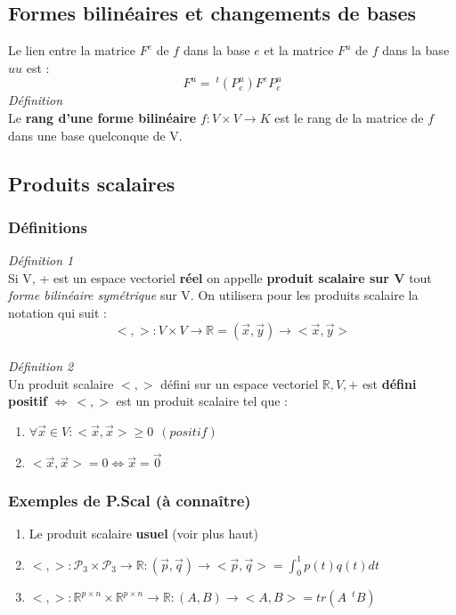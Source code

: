 \documentclass[12pt, a4paper, openany]{article}
\begin{document}
\subsection{Formes bilinéaires et changements de bases}
Le lien entre la matrice $F^e$ de $f$ dans la base $e$ et la matrice $F^u$ de $f$ dans la base $uu$ est :
$$F^u =\ ^t(P_e^u)F^eP^u_e$$
\emph{Définition}\\
Le \textbf{rang d'une forme bilinéaire} $f : V \times V \rightarrow K$ est le rang de la matrice de $f$ dans une base quelconque de V.

\subsection{Produits scalaires}
\subsubsection{Définitions}
\emph{Définition 1}\\
Si V, + est un espace vectoriel \textbf{réel} on appelle \textbf{produit scalaire sur V} tout \textit{forme bilinéaire symétrique} sur V. On utilisera pour les produits scalaire la notation qui suit :
$$< , > : V \times V \rightarrow \mathbb{R} = (\vec{x}, \vec{y}) \rightarrow <\vec{x}, \vec{y}>$$\\

\emph{Définition 2}\\
Un produit scalaire $< , >$ défini sur un espace vectoriel $\mathbb{R}, V, +$ est \textbf{défini positif} $\Leftrightarrow\  < , >$ est un produit scalaire tel que :
\begin{enumerate}
\item $\forall \vec{x} \in V : <\vec{x}, \vec{x}> \geq 0\ \ (positif)$
\item $< \vec{x}, \vec{x}> = 0 \Leftrightarrow \vec{x} = \vec{0}$
\end{enumerate}
\subsubsection{Exemples de P.Scal (à connaître)}
\begin{enumerate}
\item Le produit scalaire \textbf{usuel} (voir plus haut)
\item $< , > : \mathcal{P}_3 \times \mathcal{P}_3 \rightarrow \mathbb{R} : (\vec{p}, \vec{q}) \rightarrow <\vec{p}, \vec{q}> = \int_0^1 p(t)q(t) dt$
\item $< , > : \mathbb{R}^{p \times n} \times \mathbb{R}^{p \times n} \rightarrow \mathbb{R} : (A, B) \rightarrow <A, B> = tr(A\ \ ^tB)$
\end{enumerate}
\end{document}
